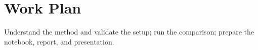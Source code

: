 \section*{Work Plan}
Understand the method and validate the setup; run the comparison; prepare the notebook, report, and presentation.
